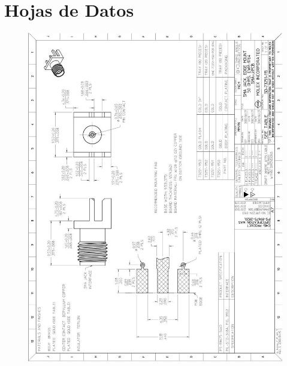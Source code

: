 \chapter{ Hojas de Datos }
\begin{figure}[H]
	\begin{center}
 		\includegraphics[width = .9\textwidth]{Tesis/Imagenes/Datos.JPG}
	\label{Ap-jackRF}
    \end{center} 
\end{figure}

